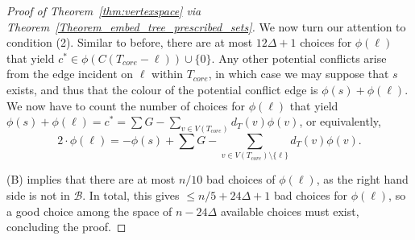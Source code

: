 \documentclass[a4paper,11pt,hidelinks]{amsart}
\theoremstyle{definition}
\begin{document}
\begin{proof}[Proof of Theorem~\ref{thm:vertexspace} via Theorem~\ref{Theorem_embed_tree_prescribed_sets}]
\par We now turn our attention to condition (2). Similar to before, there are at most $12\Delta+1$ choices for $\phi(\ell)$ that yield $c^*\in \phi(C(T_{core}-\ell))\cup\{0\}$. Any other potential conflicts arise from the edge incident on $\ell$ within $T_{core}$, in which case we may suppose that $s$ exists, and thus that the colour of the potential conflict edge is $\phi(s)+\phi(\ell)$. We now have to count the number of choices for $\phi(\ell)$ that yield $\phi(s)+\phi(\ell)=c^*=\sum G - \sum_{v\in V(T_{core})}d_T(v)\phi(v)$, or equivalently, 
$$2\cdot \phi(\ell)=-\phi(s)+\sum G- \sum_{v\in V(T_{core})\setminus\{\ell\}}d_T(v)\phi(v) .$$
\par (B) implies that there are at most $n/10$ bad choices of $\phi(\ell)$, as the right hand side is not in $\mathcal{B}$. In total, this gives $\leq n/5 + 24\Delta +1 $ bad choices for $\phi(\ell)$, so a good choice among the space of $n-24\Delta$ available choices must exist, concluding the proof. \end{proof}
\end{document}
